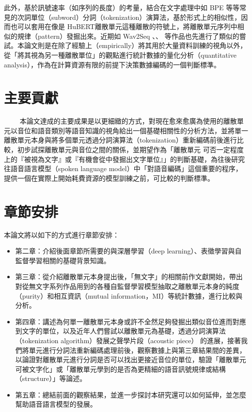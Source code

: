 此外，基於訊號速率（如序列的長度）的考量，結合在文字處理中如 BPE 等等常見的次詞單位（subword）分詞（tokenization）演算法，基於形式上的相似性，因而也可以套用在像是 HuBERT離散單元這種離散的符號上，將離散單元序列中相似的規律（pattern）發掘出來。近期如 Wav2Seq \cite{wu2023wav2seq}、\cite{DBLP:conf/interspeech/Ren00ZW22}、\cite{chang2024exploring} 等作品也先進行了類似的嘗試。本論文則是在除了經驗上（empirically）將其用於大量資料訓練的視角以外，從「將其視為另一種離散單位」的觀點進行統計數據的量化分析（quantitative analysis），作為在計算資源有限的前提下決策數據編碼的一個判斷標準。

\section{主要貢獻}
　　
本論文達成的主要成果是以更細緻的方式，對現在愈來愈廣為使用的離散單元以音位和語音類別等語音知識的視角給出一個基礎相關性的分析方法，並將單一離散單元本身與將多個單元透過分詞演算法（tokenization）重新編碼前後進行比較，初步試探離散單元與音位之間的關係，並期望作為「離散單元 可否一定程度上的『被視為文字』或『有機會從中發掘出文字單位』」的判斷基礎，為往後研究往語音語言模型（spoken language model）中「對語音編碼」這個重要的程序，提供一個在實際上開始耗費資源的模型訓練之前，可比較的判斷標準。

\section{章節安排}

本論文將以如下的方式進行章節安排：

\begin{itemize}
  \itemsep -2pt %
  \item  第二章：介紹後面章節所需要的與深層學習（deep learning）、表徵學習與自監督學習相關的基礎背景知識。
  \item  第三章：從介紹離散單元本身提出後，「無文字」的相關前作文獻開始，帶出對從無文字系列作品用到的各種自監督學習模型抽取之離散單元本身的純度（purity）和相互資訊（mutual information，MI）等統計數據，進行比較與分析。
  \item  第四章：講述為何單一離散單元本身或許不全然足夠發掘出類似音位進而對應到文字的單位，以及近年人們嘗試以離散單元為基礎，透過分詞演算法（tokenization algorithm）發展之聲學片段（acoustic piece） 的進展，接著我們將單元進行分詞法重新編碼處理前後，觀察數據上與第三章結果間的差異，以論證對離散單元進行分詞是否可以找出更接近音位的單位，驗證「離散單元可被文字化」或「離散單元學到的是否為更精細的語音訊號規律或結構（structure）」等論述。
  \item  第五章：總結前面的觀察結果，並進一步探討本研究還可以如何延伸，並怎麼幫助語音語言模型的發展。
\end{itemize}

